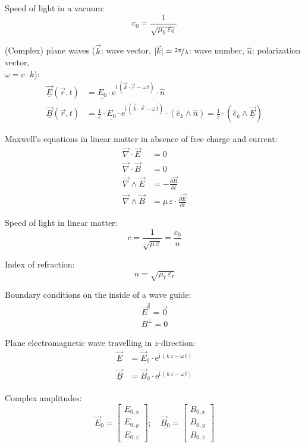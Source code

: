 \documentclass[fontsize=11pt,a4paper]{scrartcl}
\begin{document}
Speed of light in a vacuum:
\[
	c_0=\frac{1}{\sqrt{\mu_0\,\varepsilon_0}}
\]

(Complex) plane waves ($\vec k$: wave vector, $|\vec k|=\nicefrac{2\pi}{\lambda}$: wave number, $\hat n$: polarization vector,\\ $\omega=c\cdot k$):
\begin{align*}
	\underline{\vec E}(\vec r,t)&=\underline{E_0}\cdot\mathrm{e}^{\mathrm{i}\,(\vec k\cdot\vec r-\omega\,t)}\cdot\hat n\\
	\underline{\vec B}(\vec r,t)&=\frac{1}{c}\cdot\underline{E_0}\cdot\mathrm{e}^{\mathrm{i}\,(\vec k\cdot\vec r-\omega\,t)}\cdot(\hat e_k\wedge\hat n)
		=\frac{1}{c}\cdot(\hat e_k\wedge\underline{\vec E})
\end{align*}

Maxwell's equations in linear matter in absence of free charge and current:
\begin{align*}
	\vec\nabla\cdot\vec E&=0\\
	\vec\nabla\cdot\vec B&=0\\
	\vec\nabla\wedge\vec E&=-\frac{\partial\vec B}{\partial t}\\
	\vec\nabla\wedge\vec B&=\mu\,\varepsilon\cdot\frac{\partial\vec E}{\partial t}
\end{align*}

Speed of light in linear matter:
\[
	c=\frac{1}{\sqrt{\mu\,\varepsilon}}=\frac{c_0}{n}
\]

Index of refraction:
\[
	n=\sqrt{\mu_\mathrm{r}\,\varepsilon_\mathrm{r}}
\]

Boundary conditions on the inside of a wave guide:
\begin{gather*}
	\vec E^\parallel=\vec 0\\
	B^\perp=0
\end{gather*}

Plane electromagnetic wave travelling in $z$-direction:
\begin{align*}
	\underline{\vec E}&=\underline{\vec E_0}\cdot\mathrm{e}^{\mathrm{i}\,(k\,z-\omega\,t)}\\
	\underline{\vec B}&=\underline{\vec B_0}\cdot\mathrm{e}^{\mathrm{i}\,(k\,z-\omega\,t)}
\end{align*}

Complex amplitudes:
\begin{equation*}
	\underline{\vec E_0}=\begin{bmatrix}E_{0,x}\\E_{0,y}\\E_{0,z}\end{bmatrix};\quad
	\underline{\vec B_0}=\begin{bmatrix}B_{0,x}\\B_{0,y}\\B_{0,z}\end{bmatrix}
\end{equation*}
\end{document}
